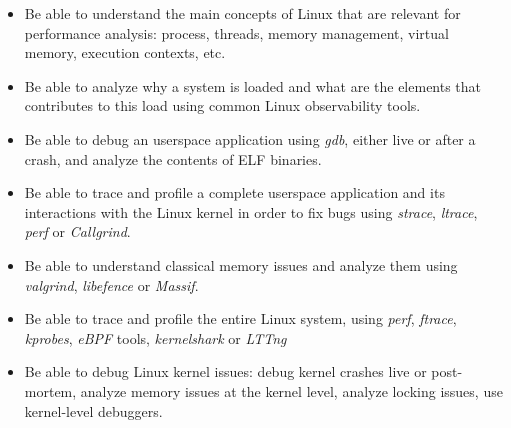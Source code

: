 {{\begin{itemize}
    \item Be able to understand the main concepts of Linux that are
      relevant for performance analysis: process, threads, memory
      management, virtual memory, execution contexts, etc.
    \item Be able to analyze why a system is loaded and what are the
      elements that contributes to this load using common Linux
      observability tools.
    \item Be able to debug an userspace application using {\em gdb},
      either live or after a crash, and analyze the contents of ELF
      binaries.
    \item Be able to trace and profile a complete userspace application
      and its interactions with the Linux kernel in order to fix bugs
      using {\em strace}, {\em ltrace}, {\em perf} or {\em Callgrind}.
    \item Be able to understand classical memory issues and analyze them
      using {\em valgrind}, {\em libefence} or {\em Massif}.
    \item Be able to trace and profile the entire Linux system, using
      {\em perf}, {\em ftrace}, {\em kprobes}, {\em eBPF} tools, {\em
        kernelshark} or {\em LTTng}
    \item Be able to debug Linux kernel issues: debug kernel crashes
      live or post-mortem, analyze memory issues at the kernel level,
      analyze locking issues, use kernel-level debuggers.
    \end{itemize}
  }
}

\def \trainingprerequisites{
  \begin{itemize}
    \prerequisitecommandline
    \prerequisiteembeddedlinux
    \prerequisiteenglish
  \end{itemize}
}


\def \onsitelecturetimeratio{40}
\def \onsitelabtimeratio{60}


